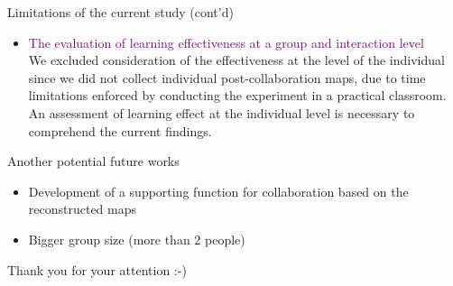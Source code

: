 \begin{frame}{Limitations of the current study (cont'd)}
    \begin{itemize}
        \item \textcolor{purple}{The evaluation of learning effectiveness at a group and interaction level}\\
        {\small We excluded consideration of the 
        effectiveness at the level of the individual since 
        we did not collect individual post-collaboration maps, due to
        time limitations enforced by conducting the experiment in a practical classroom.
        An assessment of learning effect at the individual level is 
        necessary to comprehend the current findings. }
    \end{itemize}
\end{frame}

\begin{frame}{Another potential future works}
    \begin{itemize}
        \item Development of a supporting function for collaboration based on the reconstructed maps\\
        \item Bigger group size (more than 2 people)\\
    \end{itemize}
\end{frame}

\begin{frame}{}
    Thank you for your attention :-)
\end{frame}


